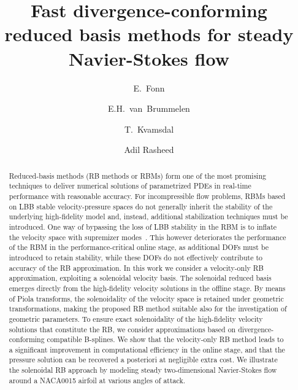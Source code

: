 \documentclass[onecolumn, twoside, a4paper, 11pt]{article}
\begin{document}
\title{Fast divergence-conforming reduced basis methods for steady Navier-Stokes flow}
\author[1]{E.~Fonn}
\author[2]{E.H.~van~Brummelen}
\author[1,3]{T.~Kvamsdal}
\author[1]{Adil Rasheed}

\maketitle

\begin{abstract}
  Reduced-basis methods (RB methods or RBMs) form one of the most promising techniques to
  deliver numerical solutions of parametrized PDEs in real-time performance
  with reasonable accuracy. For incompressible flow problems, RBMs based on LBB
  stable velocity-pressure spaces do not generally inherit the stability
  of the underlying high-fidelity model and, instead, additional stabilization techniques
  must be introduced. One way of bypassing the loss of LBB stability in the RBM is to
  inflate the velocity space with supremizer modes~\cite{Ballarin2015ssp,Stabile2017fvp}. This however
  deteriorates the performance of the RBM in the performance-critical online stage, as
  additional DOFs must be introduced to retain stability, while these DOFs do not effectively
  contribute to accuracy of the RB approximation. In this work we consider a velocity-only
  RB approximation, exploiting a solenoidal velocity basis. The solenoidal reduced basis
  emerges directly from the high-fidelity velocity solutions in the offline stage. By means
  of Piola transforms, the solenoidality of the velocity space is retained under geometric
  transformations, making the proposed RB method suitable also for the investigation of
  geometric parameters. To ensure exact solenoidality of the high-fidelity velocity solutions
  that constitute the RB, we consider approximations based on divergence-conforming compatible
  B-splines. We show that the velocity-only RB method leads to a significant improvement in
  computational efficiency in the online stage, and that the pressure solution can be recovered
  a posteriori at negligible extra cost. We illustrate the solenoidal RB approach by modeling
  steady two-dimensional Navier-Stokes flow around a NACA0015 airfoil at various angles of attack.
\end{abstract}
\end{document}
